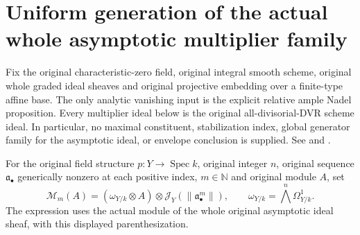 \section{Uniform generation of the actual whole asymptotic multiplier family}

Fix the original characteristic-zero field, original integral smooth
scheme, original whole graded ideal sheaves and original projective
embedding over a finite-type affine base. The only analytic vanishing
input is the explicit relative ample Nadel proposition. Every multiplier
ideal below is the original all-divisorial-DVR scheme ideal. In particular,
no maximal constituent, stabilization index, global generator family for
the asymptotic ideal, or envelope conclusion is supplied.
See \cite[Theorem~5.20]{BJ22} and \cite[Theorem~3.1]{FHX}.

\begin{definition}
\label{def:c0n-asymptotic-adjoint-module}
\leanok
For the original field structure $p:Y\to\operatorname{Spec}k$, original
integer $n$, original sequence $\mathfrak a_\bullet$ generically nonzero
at each positive index, $m\in\mathbb N$ and original module $A$, set
\[
 \mathcal M_m(A)=
 (\omega_{Y/k}\otimes A)\otimes
 \mathcal J_Y(\|\mathfrak a_\bullet^m\|),
 \qquad \omega_{Y/k}=\bigwedge^n\Omega^1_{Y/k}.
\]
The expression uses the actual module of the whole original asymptotic
ideal sheaf, with this displayed parenthesization.
\end{definition}


